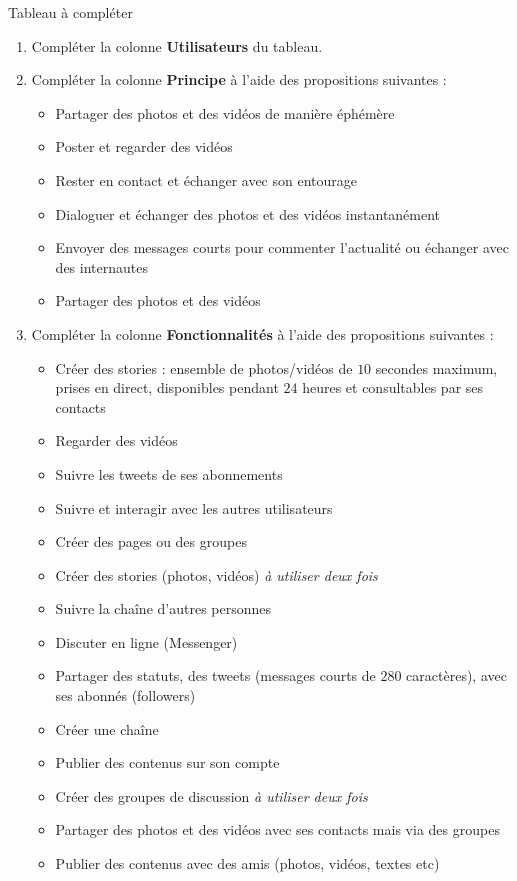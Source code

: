 \documentclass[a4paper, dvipsnames]{article}
\begin{document}
\begin{activite}[breakable]{Tableau à compléter}{}
  \begin{enumerate}
    \item Compléter la colonne \textbf{Utilisateurs} du tableau.
    \item Compléter la colonne \textbf{Principe} à l'aide des propositions suivantes :
      \begin{multicols}{2}
	\begin{itemize}
	  \item Partager des photos et des vidéos de manière éphémère
	  \item Poster et regarder des vidéos
	  \item Rester en contact et échanger avec son entourage\columnbreak
	  \item Dialoguer et échanger des photos et des vidéos instantanément
	  \item Envoyer des messages courts pour commenter l'actualité ou échanger avec des internautes
	  \item Partager des photos et des vidéos
	\end{itemize}
      \end{multicols}
    \item Compléter la colonne \textbf{Fonctionnalités} à l'aide des propositions suivantes :
      \begin{multicols}{2}
	\begin{itemize}
	  \item Créer des stories : ensemble de photos/vidéos de $10$ secondes maximum, prises en direct, disponibles pendant $24$ heures et consultables par ses contacts
	  \item Regarder des vidéos
	  \item Suivre les tweets de ses abonnements
	  \item Suivre et interagir avec les autres utilisateurs
	  \item Créer des pages ou des groupes
	  \item Créer des stories (photos, vidéos) \textit{à utiliser deux fois}
	  \item Suivre la chaîne d'autres personnes
	  \item Discuter en ligne (Messenger)
	  \item Partager des statuts, des tweets (messages courts de $280$ caractères), avec ses abonnés (followers)
	  \item Créer une chaîne
	  \item Publier des contenus sur son compte
	  \item Créer des groupes de discussion \textit{à utiliser deux fois}
	  \item Partager des photos et des vidéos avec ses contacts mais via des groupes
	  \item Publier des contenus avec des amis (photos, vidéos, textes etc)
	\end{itemize} 
      \end{multicols}
  \end{enumerate} 
\end{activite}
\end{document}
